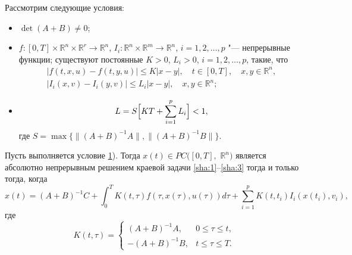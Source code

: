 \smallskip

Рассмотрим следующие условия:
\begin{itemize}
\item[1)]   $\det (A+B)\ne 0$; \hypertarget{sha:1)}{}

\hypertarget{sha:2)}{}
\item[2)] $f: [0, T]\times \mathbb R^{n}\times \mathbb R^{r}\to \mathbb R^{n}$, 
$I_{i}: \mathbb R^{n}\times \mathbb R^{m}\to \mathbb R^{n}$, $i=1, 2, \dots, p$ "--- непрерывные функции; существуют постоянные $K>0$, $L_{i}>0$, $i=1, 2, \dots, p$, такие, что
\begin{gather} 
\label{sha:6} 
|f(t,x,u)-f(t,y,u)|\le K|x-y|,\quad t\in [0, T], \quad x,y\in \mathbb R^{n},                      
\\
\label{sha:7} 
|I_{i}(x,v)-I_{i}(y,v)|\le L_{i}|x-y|,\quad x,y\in \mathbb R^{n};      
\end{gather} 

\hypertarget{sha:3)}{}
\item[3)]
\begin{equation} \label{sha:8} 
L=S\Bigl[KT+\sum_{i=1}^{p}L_{i}\Bigr]<1,
\end{equation} 
где $S=\max\bigl\{\| (A+B)^{-1} A\| , \| (A+B)^{-1} B \| \bigr\}$.

\end{itemize}

\smallskip

\hypertarget{sha:th:1)}{}
\begin{theorem}[1]Пусть выполняется условие\/ {\rm \hyperlink{sha:1)}{1}).} 
Тогда $x(t)\in PC ([0, T],$ $ \mathbb R^{n} )$ является абсолютно непрерывным  решением краевой задачи \eqref{sha:1}--\eqref{sha:3} тогда и только тогда{\rm ,} когда 
\begin{equation} 
\label{sha:9} 
x(t)=(A+B)^{-1} C+\int _{0}^{T}K(t,\tau )f(\tau ,x(\tau ),u(\tau))d\tau+\sum_{i=1}^{p}K(t,t_{i})I_{i} (x(t_{i} ),v_{i} ) ,                   
\end{equation} 
где 
$$K(t,\tau)=\left\{\begin{array}{rl} 
(A+B)^{-1}A, & 0\le\tau\le t,
\\ 
-(A+B)^{-1} B, & t\le\tau\le T.
\end{array}\right. $$ 
\end{theorem}

\smallskip

